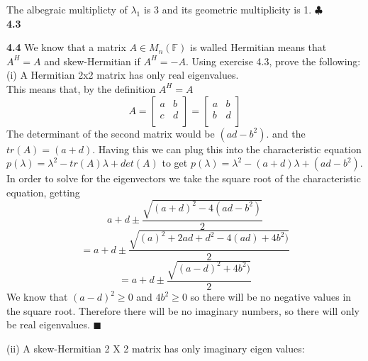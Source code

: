 \documentclass[letterpaper,12pt]{article}
\theoremstyle{definition}
\begin{document}
  The albegraic multiplicty of $\lambda_1$ is 3 and its geometric multiplicity is 1. \hfill $\clubsuit$\\
 
 


 \textbf{4.3}
 
 


 \textbf{4.4}
 We know that  a matrix $A\in M_n(\mathbb{F})$ is walled Hermitian means that $A^H =A$ and skew-Hermitian if $A^H = -A$. Using exercise 4.3, prove the following:\\
 
 (i) A Hermitian 2x2 matrix has only real eigenvalues.\\
 This means that, by the definition $A^H = A$
 \[A= \begin{bmatrix}
    a & b\\
    c & d\\
  \end{bmatrix}
  =
 \begin{bmatrix}
    a & b\\
    b & d\\
  \end{bmatrix}\]
  The determinant of the second matrix would be $(ad-b^2)$. and the $tr(A)=(a+d)$. Having this we can plug this into the characteristic equation $p(\lambda)=\lambda^2 - tr(A)\lambda +det(A)$ to get $p(\lambda)=\lambda^2 - (a+d)\lambda + (ad-b^2)$. In order to solve for the eigenvectors we take the square root of the characteristic equation, getting
  \[a+d \pm \frac {\sqrt{ (a+d)^2 -4(ad-b^2)}}{2}\]
\[=a+d \pm \frac {\sqrt{(a)^2+2ad+d^2-4(ad)+4b^2)}}{2}\]
\[=a+d \pm \frac {\sqrt{(a-d)^2+4b^2)}}{2}\]
We know that $(a-d)^2\geq 0$ and $4b^2 \geq 0$ so there will be no negative values in the square root. Therefore there will be no imaginary numbers, so there will only be real eigenvalues. $\blacksquare$

(ii) A skew-Hermitian 2 X 2 matrix has only imaginary eigen values:
\end{document}
